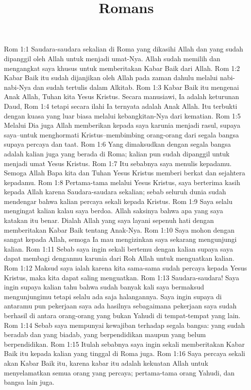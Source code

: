 

\title{Romans}

Rom 1:1  Saudara-saudara sekalian di Roma yang dikasihi Allah dan yang sudah dipanggil oleh Allah untuk menjadi umat-Nya. Allah sudah memilih dan mengangkat saya khusus untuk memberitakan Kabar Baik dari Allah.
Rom 1:2  Kabar Baik itu sudah dijanjikan oleh Allah pada zaman dahulu melalui nabi-nabi-Nya dan sudah tertulis dalam Alkitab.
Rom 1:3  Kabar Baik itu mengenai Anak Allah, Tuhan kita Yesus Kristus. Secara manusiawi, Ia adalah keturunan Daud,
Rom 1:4  tetapi secara ilahi Ia ternyata adalah Anak Allah. Itu terbukti dengan kuasa yang luar biasa melalui kebangkitan-Nya dari kematian.
Rom 1:5  Melalui Dia juga Allah memberikan kepada saya karunia menjadi rasul, supaya saya--untuk menghormati Kristus--membimbing orang-orang dari segala bangsa supaya percaya dan taat.
Rom 1:6  Yang dimaksudkan dengan segala bangsa adalah kalian juga yang berada di Roma; kalian pun sudah dipanggil untuk menjadi umat Yesus Kristus.
Rom 1:7  Itu sebabnya saya menulis kepadamu. Semoga Allah Bapa kita dan Tuhan Yesus Kristus memberi berkat dan sejahtera kepadamu.
Rom 1:8  Pertama-tama melalui Yesus Kristus, saya berterima kasih kepada Allah karena Saudara-saudara sekalian; sebab seluruh dunia sudah mendengar bahwa kalian percaya sekali kepada Kristus.
Rom 1:9  Saya selalu mengingat kalian kalau saya berdoa. Allah saksinya bahwa apa yang saya katakan itu benar. Dialah Allah yang saya layani sepenuh hati dengan memberitakan Kabar Baik tentang Anak-Nya.
Rom 1:10  Saya mohon dengan sangat kepada Allah, semoga Ia mau mengizinkan saya sekarang mengunjungi kalian.
Rom 1:11  Sebab saya ingin sekali bertemu dengan kalian supaya saya dapat membagi denganmu karunia dari Roh Allah untuk menguatkan kalian.
Rom 1:12  Maksud saya ialah karena kita sama-sama sudah percaya kepada Yesus Kristus, maka kita dapat saling menguatkan.
Rom 1:13  Saudara-saudara! Saya ingin supaya kalian tahu bahwa sudah banyak kali saya bermaksud mengunjungimu tetapi selalu ada saja halangannya. Saya ingin supaya di antaramu pun pekerjaan saya ada hasilnya sebagaimana pekerjaan saya sudah berhasil di antara orang-orang yang bukan Yahudi di tempat-tempat yang lain.
Rom 1:14  Sebab saya mempunyai kewajiban terhadap segala bangsa: yang sudah beradab dan yang biadab, yang berpendidikan maupun yang belum berpendidikan.
Rom 1:15  Itulah sebabnya saya ingin sekali memberitakan Kabar Baik itu kepada kalian yang tinggal di Roma juga.
Rom 1:16  Saya percaya sekali akan Kabar Baik itu, karena kabar itu adalah kekuatan Allah untuk menyelamatkan semua orang yang percaya; pertama-tama orang Yahudi, dan bangsa lain juga.
